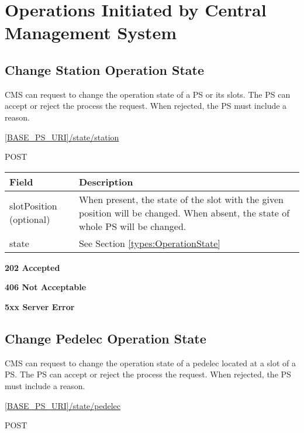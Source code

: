 \section{Operations Initiated by Central Management System}

\subsection{Change Station Operation State}

\acs{CMS} can request to change the operation state of a \acs{PS} or its slots. The \acs{PS} can accept or reject the process the request. When rejected, the \acs{PS} must include a reason.

 \url{[BASE_PS_URI]/state/station}

 POST

\begin{table}[!h]
\vspace{-7mm}
\begin{tabularx}{\linewidth}{ | l | X | }
  \hline
  \rowcolor{table-head}
  Field & Description \\
  \hline
  slotPosition (optional) 		& When present, the state of the slot with the given position will be changed. When absent, the state of whole \acs{PS} will be changed. \\
  state 					& See Section \ref{types:OperationState} \\
    \hline
\end{tabularx}
\end{table}

 \textbf{202 Accepted}

 \textbf{406 Not Acceptable}

\textbf{5xx Server Error}

\subsection{Change Pedelec Operation State}

\acs{CMS} can request to change the operation state of a pedelec located at a slot of a \acs{PS}. The \acs{PS} can accept or reject the process the request. When rejected, the \acs{PS} must include a reason.

 \url{[BASE_PS_URI]/state/pedelec}

 POST

